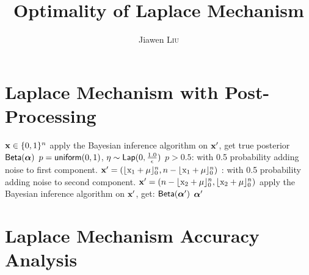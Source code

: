 \documentclass{article}
\begin{document}
\title{Optimality of Laplace Mechanism}

\author{Jiawen \textsc{Liu}} %

\maketitle

\section{Laplace Mechanism with Post-Processing}

\begin{algorithm}
  \caption{$\lapmech$}
  \label{lapmech}
  \begin{algorithmic}
  	\REQUIRE $\textbf{x} \in \{0 ,1 \}^n$
	\STATE \quad apply the Bayesian inference algorithm on $\textbf{x}'$, get true posterior $\mathsf{Beta}(\boldsymbol{\alpha})$
  	\STATE {} $p = \mathsf{uniform}(0, 1)$, $\eta \sim \mathsf{Lap}(0, \frac{1.0}{\epsilon})$
  	\STATE {} $p >0.5$: 
  	\STATE \quad \quad with 0.5 probability adding noise to first component.
  	\STATE \quad \quad  $\textbf{x}' = (\lfloor \text{x}_1 + \mu \rfloor_0^n, n - \lfloor \text{x}_1 + \mu \rfloor_0^n)$ 
  	\STATE {}: 
  	\STATE \quad \quad with 0.5 probability adding noise to second component.
  	\STATE \quad \quad  $\textbf{x}' = (n - \lfloor \text{x}_2 + \mu \rfloor_0^n, \lfloor \text{x}_2 + \mu \rfloor_0^n)$ 
	\STATE \quad apply the Bayesian inference algorithm on $\textbf{x}'$, get: $\mathsf{Beta}(\boldsymbol{\alpha}')$
	\RETURN $\boldsymbol{\alpha}'$
  \end{algorithmic}
\end{algorithm}



\clearpage
\section{Laplace Mechanism Accuracy Analysis}
\label{sec_fullacc}
\end{document}
